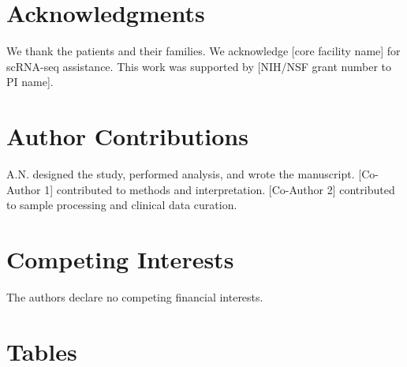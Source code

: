 \documentclass[12pt,twoside]{article}
\begin{document}

\section*{Acknowledgments}

We thank the patients and their families. We acknowledge [core facility name] for scRNA-seq assistance. This work was supported by [NIH/NSF grant number to PI name].


\section*{Author Contributions}

A.N. designed the study, performed analysis, and wrote the manuscript. [Co-Author 1] contributed to methods and interpretation. [Co-Author 2] contributed to sample processing and clinical data curation.


\section*{Competing Interests}

The authors declare no competing financial interests.


\clearpage
\section*{Tables}
\end{document}
